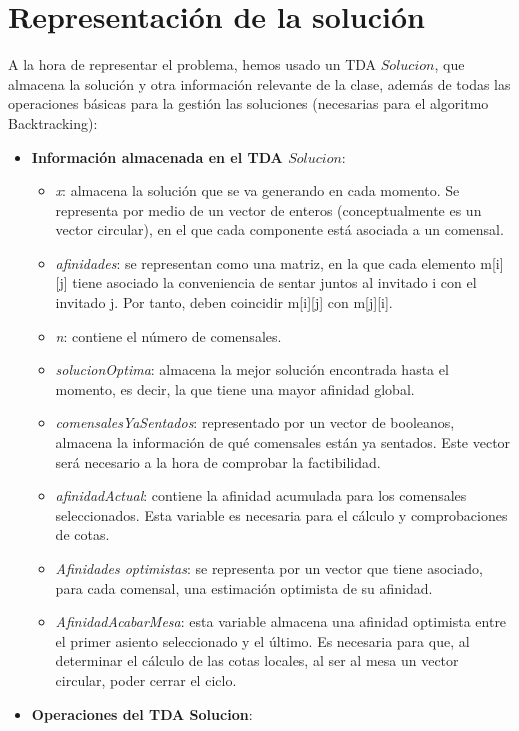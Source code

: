 \documentclass{article}
\begin{document}
	\section{Representación de la solución}
	A la hora de representar el problema, hemos usado un TDA $Solucion$, que almacena la solución y otra información relevante de la clase, además de todas las operaciones básicas para la gestión las soluciones (necesarias para el algoritmo Backtracking):
	\begin{itemize}
		\item \textbf{Información almacenada en el TDA $Solucion$}:
		\begin{itemize}
			\item \textit {x}: almacena la solución que se va generando en cada momento. Se representa por medio de un vector de enteros (conceptualmente es un vector circular), en el que cada componente está asociada a un comensal.
			\item \textit{afinidades}: se representan como una matriz, en la que cada elemento m[i][j] tiene asociado la conveniencia de sentar juntos al invitado i con el invitado j. Por tanto, deben coincidir m[i][j] con m[j][i].
			\item \textit {n}: contiene el número de comensales.
			\item \textit {solucionOptima}: almacena la mejor solución encontrada hasta el momento, es decir, la que tiene una mayor afinidad global.
			\item \textit {comensalesYaSentados}: representado por un vector de booleanos, almacena la información de qué comensales están ya sentados. Este vector será necesario a la hora de comprobar la factibilidad. 
			\item \textit {afinidadActual}: contiene la afinidad acumulada para los comensales seleccionados. Esta variable es necesaria para el cálculo y comprobaciones de cotas. 
			\item \textit {Afinidades optimistas}: se representa por un vector que tiene asociado, para cada comensal, una estimación optimista de su afinidad.
			\item \textit {AfinidadAcabarMesa}: esta variable almacena una afinidad optimista entre el primer asiento seleccionado y el último. Es necesaria para que, al determinar el cálculo de las cotas locales, al ser al mesa un vector circular, poder cerrar el ciclo.
		\end{itemize}
		\item \textbf{Operaciones del TDA Solucion}:
		\begin{itemize}

\end{itemize}
\end{itemize}
\end{document}
